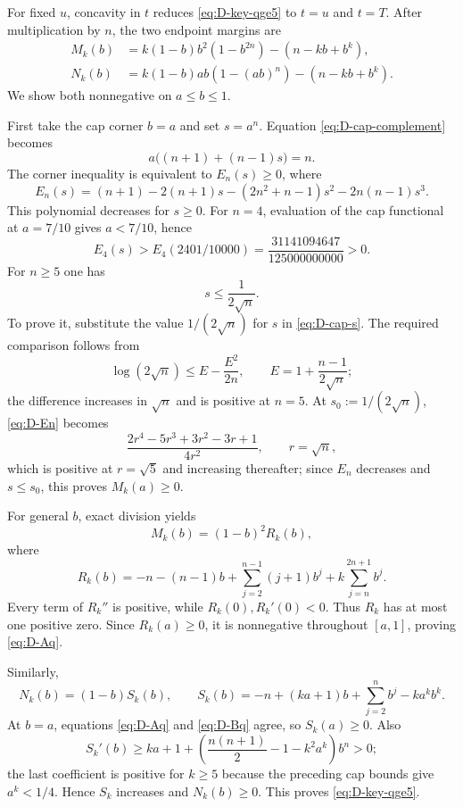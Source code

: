 \documentclass[11pt]{article}
\theoremstyle{definition}
\theoremstyle{remark}
\begin{document}
For fixed $u$, concavity in $t$ reduces
\eqref{eq:D-key-qge5} to $t=u$ and $t=T$.  After multiplication by $n$,
the two endpoint margins are
\begin{align}
 M_k(b)&=k(1-b)b^2(1-b^{2n})-(n-kb+b^k),\label{eq:D-Aq}\\
 N_k(b)&=k(1-b)ab(1-(ab)^n)-(n-kb+b^k).\label{eq:D-Bq}
\end{align}
We show both nonnegative on $a\le b\le1$.

First take the cap corner $b=a$ and set $s=a^n$.  Equation
\eqref{eq:D-cap-complement} becomes
\begin{equation}\label{eq:D-cap-s}
 a\bigl((n+1)+(n-1)s\bigr)=n.
\end{equation}
The corner inequality is equivalent to $E_n(s)\ge0$, where
\begin{equation}\label{eq:D-En}
 E_n(s)=(n+1)-2(n+1)s-(2n^2+n-1)s^2-2n(n-1)s^3.
\end{equation}
This polynomial decreases for $s\ge0$.  For $n=4$, evaluation of the cap
functional at $a=7/10$ gives $a<7/10$, hence
\[
 E_4(s)>E_4(2401/10000)
 =\frac{31141094647}{125000000000}>0.
\]
For $n\ge5$ one has
\begin{equation}\label{eq:D-s-upper}
 s\le\frac1{2\sqrt n}.
\end{equation}
To prove it, substitute the value $1/(2\sqrt n)$ for $s$ in
\eqref{eq:D-cap-s}.  The required comparison follows from
\[
 \log(2\sqrt n)\le E-\frac{E^2}{2n},\qquad
 E=1+\frac{n-1}{2\sqrt n};
\]
the difference increases in $\sqrt n$ and is positive at $n=5$.
At $s_0:=1/(2\sqrt n)$, \eqref{eq:D-En} becomes
\[
 \frac{2r^4-5r^3+3r^2-3r+1}{4r^2},\qquad r=\sqrt n,
\]
which is positive at $r=\sqrt5$ and increasing thereafter; since $E_n$
decreases and $s\le s_0$, this proves
$M_k(a)\ge0$.

For general $b$, exact division yields
\begin{equation}\label{eq:D-A-factor}
 M_k(b)=(1-b)^2R_k(b),
\end{equation}
where
\[
 R_k(b)=-n-(n-1)b+\sum_{j=2}^{n-1}(j+1)b^j
 +k\sum_{j=n}^{2n+1}b^j.
\]
Every term of $R_k''$ is positive, while $R_k(0),R_k'(0)<0$.  Thus
$R_k$ has at most one positive zero.  Since $R_k(a)\ge0$, it is
nonnegative throughout $[a,1]$, proving \eqref{eq:D-Aq}.

Similarly,
\begin{equation}\label{eq:D-B-factor}
 N_k(b)=(1-b)S_k(b),\qquad
 S_k(b)=-n+(ka+1)b+\sum_{j=2}^n b^j-ka^kb^k.
\end{equation}
At $b=a$, equations \eqref{eq:D-Aq} and \eqref{eq:D-Bq} agree, so
$S_k(a)\ge0$.  Also
\[
 S_k'(b)\ge ka+1+
 \left(\frac{n(n+1)}2-1-k^2a^k\right)b^n>0;
\]
the last coefficient is positive for $k\ge5$ because the preceding cap
bounds give $a^k<1/4$.  Hence $S_k$ increases and $N_k(b)\ge0$.
This proves \eqref{eq:D-key-qge5}.
\end{document}
